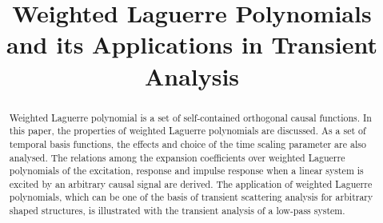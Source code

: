 \documentclass[conference, a4paper]{IEEEtran}
\begin{document}
\title{Weighted Laguerre Polynomials and its Applications in Transient
Analysis}





% 
\author{
}




\maketitle

\begin{abstract}
Weighted Laguerre polynomial is a set of self-contained orthogonal
causal functions. In this paper, the properties of weighted Laguerre
polynomials are discussed. As a set of temporal basis functions, the
effects and choice of the time scaling parameter are also analysed. The
relations among the expansion coefficients over weighted Laguerre
polynomials of the excitation, response and impulse response when a
linear system is excited by an arbitrary causal signal are derived. The
application of weighted Laguerre polynomials, which can be one of the
basis of transient scattering analysis for arbitrary shaped structures,
is illustrated with the transient analysis of a low-pass system.
\end{abstract}
\end{document}
